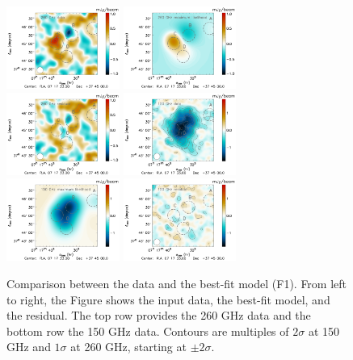 \documentclass[twocolumn,traditabstract]{aa}
\begin{document}
\begin{figure}[h]
\centering
\includegraphics[width=0.33\textwidth]{Figure/MCMC_data_1mm_ksz2.pdf}
\includegraphics[width=0.33\textwidth]{Figure/MCMC_best_fit_1mm_ksz2.pdf}
\includegraphics[width=0.33\textwidth]{Figure/MCMC_residual_1mm_ksz2.pdf}
\includegraphics[width=0.33\textwidth]{Figure/MCMC_data_2mm_ksz2.pdf}
\includegraphics[width=0.33\textwidth]{Figure/MCMC_best_fit_2mm_ksz2.pdf}
\includegraphics[width=0.33\textwidth]{Figure/MCMC_residual_2mm_ksz2.pdf}
\caption{\footnotesize{Comparison between the data and the best-fit model (F1). From left to right, the Figure  shows the input data, the best-fit model, and the residual. The top row provides the 260 GHz data and the bottom row the 150 GHz data. Contours are multiples of $2 \sigma$ at 150 GHz and $1 \sigma$ at 260 GHz, starting at $\pm 2 \sigma$.}}
\label{fig:best_fit_maps}
\end{figure}
\end{document}
